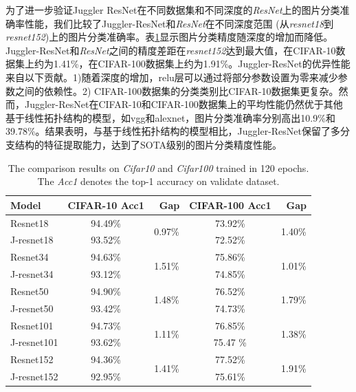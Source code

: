 为了进一步验证Juggler ResNet在不同数据集和不同深度的\emph{ResNet}上的图片分类准确率性能，我们比较了Juggler-ResNet和\emph{ResNet}在不同深度范围 (从\emph{resnet18}到\emph{resnet152})上的图片分类准确率。表\ref{Cifar10_Cifar100}显示图片分类精度随深度的增加而降低。Juggler-ResNet和\emph{ResNet}之间的精度差距在\emph{resnet152}达到最大值，在CIFAR-10数据集上约为1.41\%，在CIFAR-100数据集上约为1.91\%。Juggler-ResNet的优异性能来自以下贡献。1)随着深度的增加，relu层可以通过将部分参数设置为零来减少参数之间的依赖性。2) CIFAR-100数据集的分类类别比CIFAR-10数据集更复杂。然而，Juggler-ResNet在CIFAR-10和CIFAR-100数据集上的平均性能仍然优于其他基于线性拓扑结构的模型，如vgg和alexnet，图片分类准确率分别高出10.9\%和39.78\%。结果表明，与基于线性拓扑结构的模型相比，Juggler-ResNet保留了多分支结构的特征提取能力，达到了SOTA级别的图片分类精度性能。
\begin{table}[h]
	\caption{The comparison results on \emph{Cifar10} and \emph{Cifar100} trained in 120 epochs. The \emph{Acc1} denotes the top-1 accuracy on validate dataset.}
	\label{Cifar10_Cifar100}
	\centering
	\begin{tabular}{lcccc}
		\hline
		\textbf{Model} & \textbf{CIFAR-10 Acc1}  &\textbf{\ Gap} & \textbf{CIFAR-100 Acc1}  &\textbf{\ Gap} \\
		\hline
		Resnet18   & 94.49\%     &\multirow{2}{*}{0.97\%}    & 73.92\%       &\multirow{2}{*}{1.40\%}   \\
		J-resnet18  & 93.52\%    &     & 72.52\%        &   \\
		\hline
		Resnet34   & 94.63\%    &\multirow{2}{*}{1.51\%}     & 75.86\%       &\multirow{2}{*}{1.01\%}   \\
		J-resnet34  & 93.12\%   &      & 74.85\%        &   \\
		\hline
		Resnet50   & 94.90\%     &\multirow{2}{*}{1.48\%}    & 76.52\%       &\multirow{2}{*}{1.79\%}   \\
		J-resnet50  & 93.42\%    &     & 74.73\%       &    \\
		\hline
		Resnet101  & 94.73\%     &\multirow{2}{*}{1.11\%}    & 76.85\%       &\multirow{2}{*}{1.38\%}   \\
		J-resnet101 & 93.62\%    &     & 75.47 \%     &     \\
		\hline
		Resnet152  & 94.36\%      &\multirow{2}{*}{1.41\%}   & 77.52\%        &\multirow{2}{*}{1.91\%}  \\
		J-resnet152 & 92.95\%    &    & 75.61\%      &     \\
		\hline
	\end{tabular}
\end{table}





